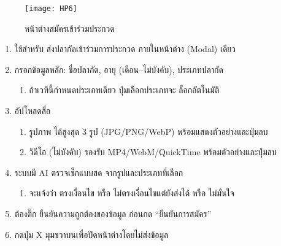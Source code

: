 \newpage

\begin{figure}[h]
	\centering
	\texttt{[image: HP6]}
	\caption{หน้าต่างสมัครเข้าร่วมประกวด}
\end{figure}


\par

\begin{sloppypar}
	\begin{enumerate}
		\item ใช้สำหรับ ส่งปลากัดเข้าร่วมการประกวด ภายในหน้าต่าง (Modal) เดียว
		\item กรอกข้อมูลหลัก: ชื่อปลากัด, อายุ (เดือน–ไม่บังคับ), ประเภทปลากัด
		\begin{enumerate}
			\item ถ้าเวทีนี้กำหนดประเภทเดียว ปุ่มเลือกประเภทจะ ล็อกอัตโนมัติ
		\end{enumerate}
		\item อัปโหลดสื่อ
		\begin{enumerate}
			\item รูปภาพ ได้สูงสุด 3 รูป (JPG/PNG/WebP) พร้อมแสดงตัวอย่างและปุ่มลบ
			\item วิดีโอ (ไม่บังคับ) รองรับ MP4/WebM/QuickTime พร้อมตัวอย่างและปุ่มลบ
		\end{enumerate}
		\item ระบบมี AI ตรวจเช็กแบบสด จากรูปและประเภทที่เลือก
		\begin{enumerate}
			\item จะแจ้งว่า ตรงเงื่อนไข หรือ ไม่ตรงเงื่อนไขแต่ยังส่งได้ หรือ ไม่มั่นใจ
		\end{enumerate}
		\item ต้องติ๊ก ยืนยันความถูกต้องของข้อมูล ก่อนกด “ยืนยันการสมัคร”
		\item กดปุ่ม X มุมขวาบนเพื่อปิดหน้าต่างโดยไม่ส่งข้อมูล
	\end{enumerate}
\end{sloppypar}

\par


